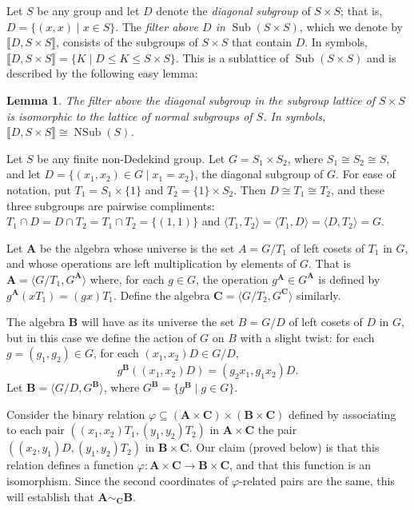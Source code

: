 \documentclass{au}
\theoremstyle{plain}
\newtheorem{lemma}{Lemma}
\newcommand{\<}{\ensuremath{\langle}}
\renewcommand{\>}{\ensuremath{\rangle}}
\renewcommand{\phi}{\ensuremath{\varphi}}
\newcommand{\lb}{\ensuremath{\llbracket}}
\newcommand{\rb}{\ensuremath{\rrbracket}}
\newcommand{\bA}{\ensuremath{\mathbf{A}}}
\newcommand{\bB}{\ensuremath{\mathbf{B}}}
\newcommand{\bC}{\ensuremath{\mathbf{C}}}
\renewcommand{\leq}{\ensuremath{\leqslant}}
\newcommand{\Sub}{\ensuremath{\operatorname{Sub}}}
\newcommand{\NSub}{\ensuremath{\operatorname{NSub}}}
\renewcommand{\phi}{\ensuremath{\varphi}}
\begin{document}
Let $S$ be any group and let $D$ denote the \emph{diagonal subgroup} of 
$S\times S$; that is, $D = \{(x,x) \mid x\in S\}$.
The \emph{filter above $D$ in} $\Sub(S\times S)$, which we denote by
$\lb D, S\times S\rb$, %
consists of the subgroups of $S\times S$ that contain $D$.  In symbols,
$\lb D, S\times S\rb = \{K \mid D \leq K \leq S\times S\}$.  
This is a sublattice of $\Sub(S\times S)$ and is described by the following easy lemma:
\begin{lemma}
\label{lem:1}
  The filter above the diagonal subgroup in the subgroup lattice of $S\times S$
  is isomorphic to the lattice of normal subgroups of $S$. In symbols, 
$\lb D, S\times S\rb \cong \NSub(S)$.
\end{lemma}

Let $S$ be any finite non-Dedekind group. Let $G = S_1 \times S_2$, where
$S_1 \cong S_2 \cong S$, and let $D = \{(x_1,x_2)\in G \mid x_1 = x_2\}$,  the
diagonal subgroup of $G$. For ease of notation, put $T_1 = S_1 \times \{1\}$ and 
$T_2 = \{1\}\times S_2$.
Then $D \cong T_1 \cong T_2$, and these three 
subgroups are pairwise compliments: $T_1\cap D = D\cap T_2 = T_1 \cap T_2 =
\{(1,1)\}$ and $ \<T_1, T_2\> = \<T_1,D\> = \<D, T_2\> = G$.

Let $\bA$ be the algebra whose universe is the set $A = G/T_1$ of left
cosets of $T_1$ in $G$, and whose operations are left multiplication by elements
of $G$. 
That is $\bA = \< G/T_1, G^{\bA}\>$ 
where, for each $g\in G$, the operation $g^{\bA} \in G^{\bA}$ is defined by
$g^{\bA}(xT_1) = (gx)T_1$.
Define the algebra $\bC = \< G/T_2, G^{\bC}\>$ similarly.  

The algebra $\bB$
will have as its universe the set $B = G/D$ of left cosets of $D$ in $G$, but in
this case we define the action of $G$ on $B$ with a slight twist:  for
each $g = (g_1, g_2) \in G$,
for each $(x_1, x_2)D \in G/D$,
\[
g^{\bB}((x_1,x_2)D) =  (g_2x_1, g_1 x_2)D.
\]
Let $\bB = \< G/D, G^{\bB}\>$, where $G^{\bB} =  \{g^{\bB} \mid g\in G\}$.

Consider the binary relation 
$\phi \subseteq (\bA \times \bC) \times (\bB \times \bC)$ defined by associating
to each pair $((x_1,x_2)T_1, (y_1,y_2)T_2)$ in $\bA \times \bC$
 the pair $((x_2, y_1)D, (y_1,y_2)T_2)$ in $\bB \times \bC$.
Our claim (proved below) is that this relation defines a function 
$\phi \colon \bA \times \bC \rightarrow \bB \times \bC$, 
and that this function is an isomorphism. Since the second coordinates of
$\phi$-related pairs are the same, this will establish that $\bA\sim_{\bC}\bB$. 
\end{document}
